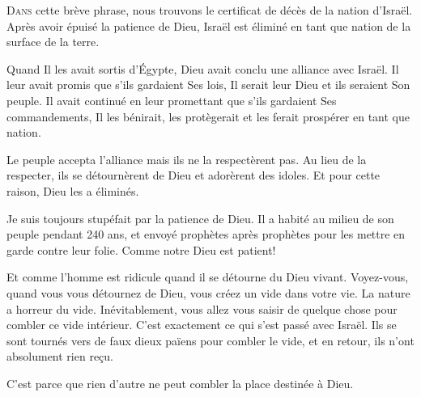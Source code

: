 

\lettrine{D}{ans} cette brève phrase, nous trouvons le
 \Og certificat de décès \Fg{} de la nation d'Israël.
 Après avoir épuisé la patience de Dieu,
 Israël est éliminé en tant que nation de la surface de la terre.

Quand Il les avait sortis d'Égypte, Dieu avait conclu
 une alliance avec Israël. Il leur avait promis
 que s'ils gardaient Ses lois,
 Il serait leur Dieu et ils seraient Son peuple.
 Il avait continué en leur promettant que s'ils gardaient Ses commandements,
 Il les bénirait, les protègerait et les ferait prospérer en tant que nation.

Le peuple accepta l'alliance \ocadr mais ils ne la respectèrent pas.
 Au lieu de la respecter, ils se détournèrent de Dieu
 et adorèrent des idoles. Et pour cette raison, Dieu les a éliminés. 


Je suis toujours stupéfait par la patience de Dieu.
 Il a habité au milieu de son peuple pendant 240 ans,
 et envoyé prophètes après prophètes pour les mettre en garde
 contre leur folie. Comme notre Dieu est patient! 

Et comme l'homme est ridicule quand il se détourne du Dieu vivant.
 Voyez-vous, quand vous vous détournez de Dieu,
 vous créez un vide dans votre vie. La nature a horreur du vide.
 Inévitablement, vous allez vous saisir de quelque chose pour combler
 ce vide intérieur. C'est exactement ce qui s'est passé avec Israël.
 Ils se sont tournés vers de faux dieux païens pour combler le vide,
 et en retour, ils n'ont absolument rien re\c{c}u. 

C'est parce que rien d'autre ne peut combler la place destinée à Dieu. 

\dvrule






